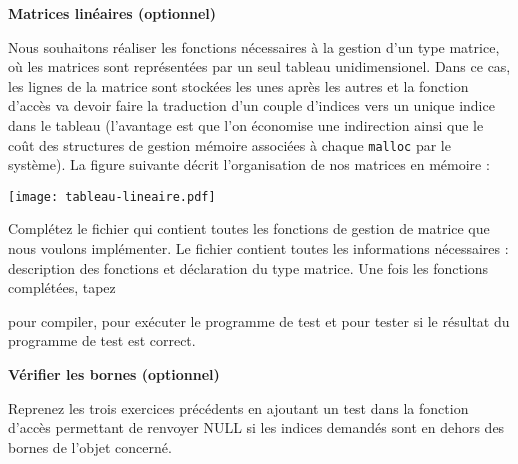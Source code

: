 \documentclass[10pt]{article}\usepackage[enonce]{exemptty}
\begin{document}
\medskip





\begin{Exercice} \textbf{Matrices linéaires (optionnel)} 

  Nous souhaitons réaliser les fonctions nécessaires à la gestion d'un type
  matrice, où les matrices sont représentées par un seul tableau
  unidimensionel. Dans ce cas, les lignes de la matrice sont stockées les unes
  après les autres et la fonction d'accès va devoir faire la traduction d'un
  couple d'indices vers un unique indice dans le tableau (l'avantage est que
  l'on économise une indirection ainsi que le coût des structures de gestion
  mémoire associées à chaque \texttt{malloc} par le système). La figure
  suivante décrit l'organisation de nos matrices en mémoire :

  \centerline{\texttt{[image: tableau-lineaire.pdf]}}

  Complétez le fichier  qui contient toutes les
  fonctions de gestion de matrice que nous voulons implémenter. Le fichier
   contient toutes les informations nécessaires :
  description des fonctions et déclaration du type matrice. Une fois les
  fonctions complétées, tapez
  
  \noindent{} pour
  compiler,  pour exécuter le programme de
  test et  pour tester si le résultat du programme de test est
  correct.
\end{Exercice}

\begin{Exercice} \textbf{Vérifier les bornes (optionnel)}

  Reprenez les trois exercices précédents en ajoutant un test dans la fonction
  d'accès permettant de renvoyer NULL si les indices demandés sont en dehors
  des bornes de l'objet concerné.
\end{Exercice}
\end{document}
